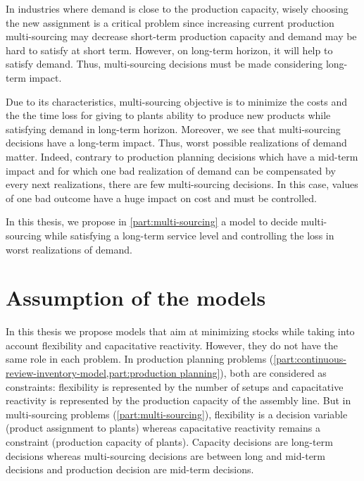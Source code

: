In industries where demand is close to the production capacity, wisely choosing the new assignment is a critical problem since increasing current production multi-sourcing may decrease short-term production capacity and demand may be hard to satisfy at short term.
However, on long-term horizon, it will help to satisfy demand.
Thus, multi-sourcing decisions must be made considering long-term impact.


Due to its characteristics, multi-sourcing objective is to minimize the costs and the the time loss for giving to plants ability to produce new products while satisfying demand in long-term horizon.
Moreover, we see that multi-sourcing decisions have a long-term impact.
Thus, worst possible realizations of demand matter.
Indeed, contrary to production planning decisions which have a mid-term impact and for which one bad realization of demand can be compensated by every next realizations, there are few multi-sourcing decisions.
In this case, values of one bad outcome have a huge impact on cost and must be controlled.


\medskip


In this thesis, we propose in \cref{part:multi-sourcing} a model to decide multi-sourcing while satisfying a long-term service level and controlling the loss in worst realizations of demand.


\section{Assumption of the models}




In this thesis we propose models that aim at minimizing stocks while taking into account flexibility and capacitative reactivity.
However, they do not have the same role in each problem.
In production planning problems (\cref{part:continuous-review-inventory-model,part:production planning}), both are considered as constraints: flexibility is represented by the number of setups and capacitative reactivity is represented by the production capacity of the assembly line.
But in multi-sourcing problems (\cref{part:multi-sourcing}), flexibility is a decision variable (product assignment to plants) whereas capacitative reactivity remains a constraint (production capacity of plants).
Capacity decisions are long-term decisions whereas multi-sourcing decisions are between long and mid-term decisions and production decision are mid-term decisions.



